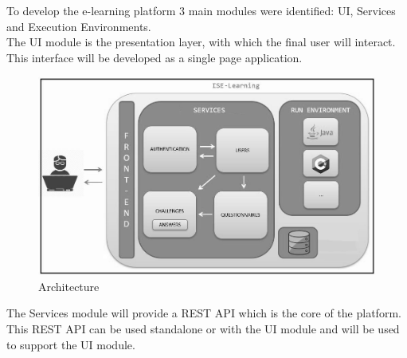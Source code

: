 To develop the e-learning platform 3 main modules were identified: UI, Services and Execution Environments.
\\
The UI module is the presentation layer, with which the final user will interact. This interface will be developed as a single page application.
\\
	\begin{figure}
  		\includegraphics[scale=0.6]{./imgs/arquitectura.JPG}
  		\caption{Architecture}
  		\label{fig:architecture}
	\end{figure} 
The Services module will provide a REST API which is the core of the platform.
\\
This REST API can be used standalone or with the UI module and will be used to support the UI module. 

\\
